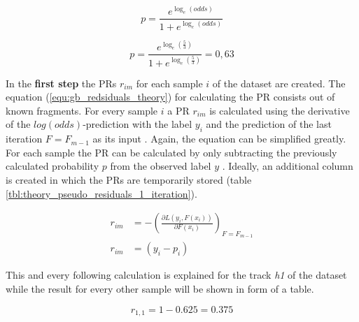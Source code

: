 \begin{equation}
    p = \frac{e^{\log_{e}(odds)}}{1 + e^{\log_{e}(odds)}} 
    \label{equ:gb_prediction}
\end{equation}

\begin{equation*}
    p = \frac{e^{\log_{e}(\frac{5}{3})}}{1 + e^{\log_{e}(\frac{5}{3})}} = 0,63
\end{equation*}

In the \textbf{first step} the \acp{PR} \(r_{im}\) for each sample \(i\) of the dataset are created. The equation (\ref{equ:gb_redsiduals_theory}) 
for calculating the \ac{PR} consists out of known fragments. For every sample \(i\) a PR \(r_{im}\) 
is calculated using the derivative of the \(log(odds)\)-prediction with the label \(y_{i}\) and the 
prediction of the last iteration \(F = F_{m - 1}\) as its input \cite[p. 361]{Hastie_2009}. Again, the equation can be 
simplified greatly. For each sample the \ac{PR} can be calculated by only 
subtracting the previously calculated probability \(p\) from the observed label \(y\) \cite{parr2022gb_explained_hrd} \cite{parr2022gb_explained_gbd}. Ideally, an additional 
column is created in which the PRs are temporarily stored (table \ref{tbl:theory_pseudo_residuals_1_iteration}). 

\begin{equation}
    \begin{aligned}
        r_{im} &= - (\frac{\partial L(y_{i}, F(x_{i}))}{\partial F(x_{i})})_{F = F_{m - 1}}
        \\
        r_{im} &= (y_{i} - p_{i})
        \label{equ:gb_redsiduals_theory}
    \end{aligned}
\end{equation}

This and every following calculation is explained for the track \emph{h1} of the dataset while the result for 
every other sample will be shown in form of a table. 

\begin{equation*}
r_{1,1} = 1 - 0.625 = 0.375
\end{equation*}

